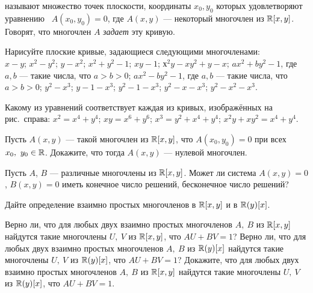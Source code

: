 \documentclass[a4paper,12pt]{article}
\begin{document}



\/ называют множество точек
плоскости, координаты $x_0,y_0$ которых удовлетворяют уравнению
\ $A(x_0,y_0)=0$,  где $A(x,y)$ --- некоторый
многочлен из $\mathbb{R}[x,y]$.
Говорят, что многочлен $A$ {\it задает}\/ эту кривую.

  Нарисуйте плоские кривые, задающиеся следующими многочленами:\\
 $x-y$;
 $x^2-y^2$;
 $y-x^2$;
 $x^2+y^2-1$;
 $xy-1$;
 $х^2y-xy^2+y-x$;
 $ax^2+by^2-1$, где $a,b$ --- такие числа, что $a>b>0$;
 $ax^2-by^2-1$, где $a,b$ --- такие числа, что $a>b>0$;
 $y^2-x^3$;\quad
{} $y-1-x^3$;\quad
{} $y^2-1-x^3$;\quad
{} $y^2-x-x^3$;\quad
{} $y^2-x^2-x^3$.

 Какому из уравнений соответствует каждая из
кривых, изо\-бра\-ж\"ен\-ных на рис.~справа:
 $x^2=x^4+y^4$;
 $xy=x^6+y^6$;
 $x^3=y^2+x^4+y^4$;
 $x^2y+xy^2=x^4+y^4$.


\vspace*{-15mm}
\vspace*{9mm}



 Пусть $A(x,y)$ --- такой многочлен из $\mathbb{R}[x,y]$, что
$A(x_0,y_0)=0$ при всех $x_0,\ y_0\in\mathbb{R}$.
Докажите, что тогда $A(x,y)$ --- нулевой многочлен.

  Пусть $A$, $B$ --- различные многочлены из $\mathbb{R}[x,y]$.
Может ли система $A(x,y)=0$, $B(x,y)=0$ иметь
конечное число решений,  бесконечное число решений?

Дайте определение взаимно простых многочленов в $\mathbb{R}[x,y]$ и в $\mathbb{R}(y)[x]$.


 Верно ли, что для любых двух взаимно простых многочленов
$A,\ B$ из $\mathbb{R}[x,y]$ найдутся такие многочлены $U,\ V$
из $\mathbb{R}[x,y]$, что $AU+BV=1$?
 Верно ли, что для любых двух взаимно простых
многочленов $A,\ B$ из $\mathbb{R}(y)[x]$  найдутся такие  многочлены
$U,\ V$ из $\mathbb{R}(y)[x]$,  что $AU+BV=1$?
 Докажите, что для любых двух взаимно простых
многочленов $A,\ B$ из $\mathbb{R}[x,y]$  найдутся такие  многочлены
$U,\ V$ из $\mathbb{R}(y)[x]$,  что $AU+BV=1$.
\end{document}
